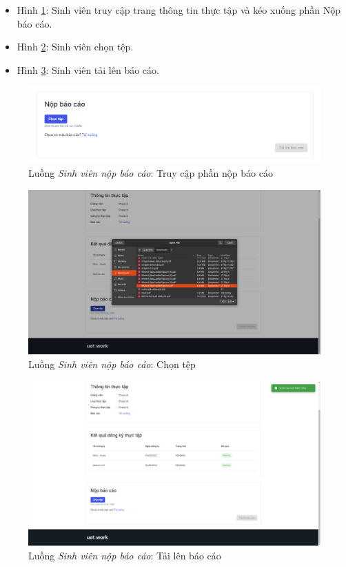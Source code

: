 \documentclass[./../main.tex]{subfiles}
\begin{document}
\begin{itemize}
	\item Hình \ref{fig:student_internship_info}: Sinh viên truy cập trang thông tin thực tập và kéo xuống phần Nộp báo cáo.
	\item Hình \ref{fig:student_choose_file}: Sinh viên chọn tệp.
	\item Hình \ref{fig:student_upload_report}: Sinh viên tải lên báo cáo.
\end{itemize}

\begin{figure}[]
	\includegraphics[width=\linewidth]{./images/image41.png}
	\caption{Luồng \emph{Sinh viên nộp báo cáo}: Truy cập phần nộp báo cáo}
	\label{fig:student_internship_info}
\end{figure}

\begin{figure}[]
	\includegraphics[width=\linewidth]{./images/image42.png}
	\caption{Luồng \emph{Sinh viên nộp báo cáo}: Chọn tệp}
	\label{fig:student_choose_file}
\end{figure}

\begin{figure}[]
	\includegraphics[width=\linewidth]{./images/image43.png}
	\caption{Luồng \emph{Sinh viên nộp báo cáo}: Tải lên báo cáo}
	\label{fig:student_upload_report}
\end{figure}
\end{document}
